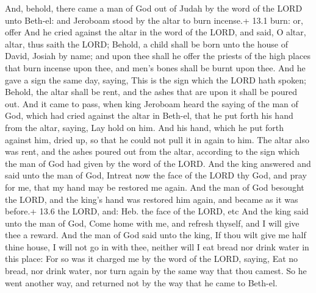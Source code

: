  And, behold, there came a man of God out of Judah by the
word of the LORD unto Beth-el: and Jeroboam stood by the altar to burn
incense.+ 13.1 burn: or, offer  And he cried against the
altar in the word of the LORD, and said, O altar, altar, thus saith the
LORD; Behold, a child shall be born unto the house of David, Josiah by
name; and upon thee shall he offer the priests of the high places that
burn incense upon thee, and men's bones shall be burnt upon thee.
 And he gave a sign the same day, saying, This is the sign
which the LORD hath spoken; Behold, the altar shall be rent, and the
ashes that are upon it shall be poured out.  And it came to
pass, when king Jeroboam heard the saying of the man of God, which had
cried against the altar in Beth-el, that he put forth his hand from the
altar, saying, Lay hold on him. And his hand, which he put forth against
him, dried up, so that he could not pull it in again to him.
 The altar also was rent, and the ashes poured out from the
altar, according to the sign which the man of God had given by the word
of the LORD.  And the king answered and said unto the man of
God, Intreat now the face of the LORD thy God, and pray for me, that my
hand may be restored me again. And the man of God besought the LORD, and
the king's hand was restored him again, and became as it was before.+
13.6 the LORD, and: Heb. the face of the LORD, etc  And the
king said unto the man of God, Come home with me, and refresh thyself,
and I will give thee a reward.  And the man of God said unto
the king, If thou wilt give me half thine house, I will not go in with
thee, neither will I eat bread nor drink water in this place:
 For so was it charged me by the word of the LORD, saying,
Eat no bread, nor drink water, nor turn again by the same way that thou
camest.  So he went another way, and returned not by the
way that he came to Beth-el.

